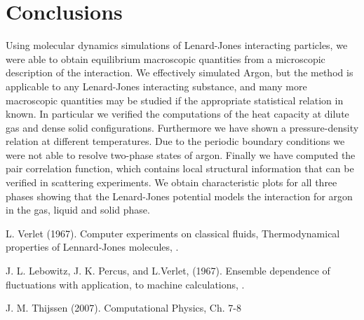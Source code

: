 \documentclass[twoside]{article}
\begin{document}
	
\section{Conclusions}
Using molecular dynamics simulations of Lenard-Jones interacting particles, we were able to obtain equilibrium macroscopic quantities from a microscopic description of the interaction. We effectively simulated Argon, but the method is applicable to any Lenard-Jones interacting substance, and many more macroscopic quantities may be studied if the appropriate statistical relation in known. In particular we verified the computations of the heat capacity at dilute gas and dense solid configurations. Furthermore we have shown a pressure-density relation at different temperatures. Due to the periodic boundary conditions we were not able to resolve two-phase states of argon. Finally we have computed the pair correlation function, which contains local structural information that can be verified in scattering experiments. We obtain characteristic plots for all three phases showing that the Lenard-Jones potential models the interaction for argon in the gas, liquid and solid phase.

%	
%
%


\begin{thebibliography}{1}
	L.   Verlet  (1967). 
	\newblock Computer  experiments   on   classical   fluids, 
	\newblock Thermodynamical properties of Lennard-Jones molecules,
	.
	
	J. L. Lebowitz, J. K. Percus, and L.Verlet, (1967).
	\newblock Ensemble dependence of fluctuations with application,
	to machine calculations,
	.
	
	J. M. Thijssen (2007).
	\newblock Computational Physics, Ch. 7-8
\end{thebibliography}
	
\end{document}
